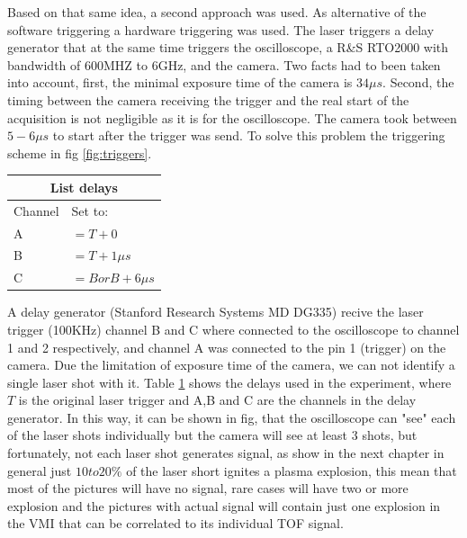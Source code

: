 Based on that same idea, a second approach was used. As alternative of the software triggering a hardware triggering was used. The laser triggers a delay generator that at the same time triggers the oscilloscope, a R&S RTO2000 with bandwidth of 600MHZ to 6GHz,  and the camera. Two facts had to been taken into account, first, the minimal exposure time of the camera is $34\mu s$. Second, the timing between the camera receiving the trigger and the real start of the acquisition is not negligible as it is for the oscilloscope. The camera took between $5-6 \mu s$ to start after the trigger was send. To solve this problem the triggering scheme in fig \ref{fig:triggers}.
\begin{table}[]
\label{tab:delaystriger}
\begin{tabular}{ll}
\multicolumn{2}{c}{List delays}                                          \\ \hline
\multicolumn{1}{|l|}{Channel} & \multicolumn{1}{l|}{Set to:}    \\ \hline
\multicolumn{1}{|l|}{A}                & \multicolumn{1}{l|}{$=T+0$}       \\ \hline
\multicolumn{1}{|l|}{B}                & \multicolumn{1}{l|}{$=T+1\mu s$}     \\ \hline
\multicolumn{1}{|l|}{C}                & \multicolumn{1}{l|}{$=B or B+6\mu s$} \\ \hline
\end{tabular}
\end{table}

A delay generator (Stanford Research Systems MD DG335) recive the laser trigger (100KHz) channel B and C where connected to the oscilloscope to channel 1 and 2 respectively, and channel A was connected to the pin 1 (trigger) on the camera. Due the limitation of exposure time of the camera, we can not identify a single laser shot with it. Table \ref{tab:delaystriger} shows the delays used in the experiment, where $T$ is the original laser trigger and  A,B and C are the channels in the delay generator. In this way, it can be shown in fig, that the oscilloscope can "see" each of the laser shots individually but the camera will see at least 3 shots, but fortunately, not each laser shot generates signal, as show in the next chapter in general just $10 to 20\%$ of the laser short ignites a plasma explosion, this mean that most of the pictures will have no signal, rare cases will have two or more explosion and the pictures with actual signal will contain just one  explosion in the VMI that can be correlated to its individual TOF signal. 

